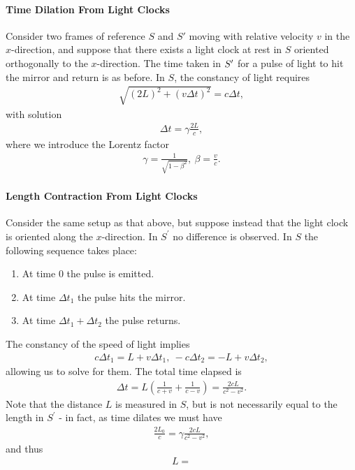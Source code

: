 \paragraph{Time Dilation From Light Clocks}
Consider two frames of reference $S$ and $S'$ moving with relative velocity $v$ in the $x$-direction, and suppose that there exists a light clock at rest in $S$ oriented orthogonally to the $x$-direction. The time taken in $S^{\prime}$ for a pulse of light to hit the mirror and return is as before. In $S$, the constancy of light requires
\begin{align*}
	\sqrt{(2L)^{2} + (v\Delta t)^{2}} = c\Delta t,
\end{align*}
with solution
\begin{align*}
	\Delta t = \gamma\frac{2L}{c},
\end{align*}
where we introduce the Lorentz factor
\begin{align*}
	\gamma = \frac{1}{\sqrt{1 - \beta^{2}}},\ \beta = \frac{v}{c}.
\end{align*}

\paragraph{Length Contraction From Light Clocks}
Consider the same setup as that above, but suppose instead that the light clock is oriented along the $x$-direction. In $S^{\prime}$ no difference is observed. In $S$ the following sequence takes place:
\begin{enumerate}
	\item At time $0$ the pulse is emitted.
	\item At time $\Delta t_{1}$ the pulse hits the mirror.
	\item At time $\Delta t_{1} + \Delta t_{2}$ the pulse returns.
\end{enumerate}
The constancy of the speed of light implies
\begin{align*}
	c\Delta t_{1} = L + v\Delta t_{1},\ -c\Delta t_{2} = -L + v\Delta t_{2},
\end{align*}
allowing us to solve for them. The total time elapsed is
\begin{align*}
	\Delta t = L\left(\frac{1}{c + v} + \frac{1}{c - v}\right) = \frac{2cL}{c^{2} - v^{2}}.
\end{align*}
Note that the distance $L$ is measured in $S$, but is not necessarily equal to the length in $S^{\prime}$ - in fact, as time dilates we must have
\begin{align*}
	\frac{2L_{0}}{c} = \gamma\frac{2cL}{c^{2} - v^{2}},
\end{align*}
and thus
\begin{align*}
	L = 
\end{align*}

